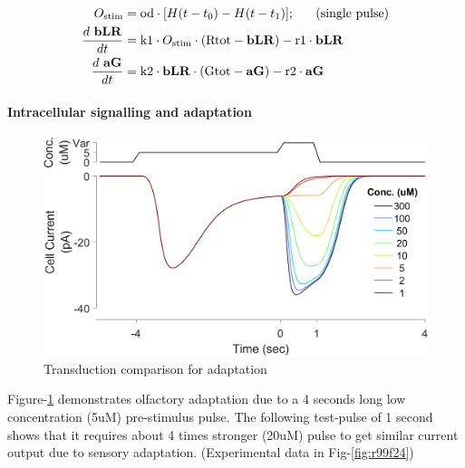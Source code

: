 \documentclass[
]{article}
\begin{document}
\begin{equation}\label{eq:tx1}
\begin{split}
O_{\rm stim} &= {\rm od} \cdot [ H(t-t_0) - H(t-t_1) ];\ \ \ \ \  \text{(single pulse)}  \\
\frac{d\ \mathbf{bLR}}{dt} &= {\rm k1} \cdot O_{\rm stim} \cdot ({\rm Rtot} - \mathbf{bLR}) - {\rm r1} \cdot \mathbf{bLR} \\
\frac{d\ \mathbf{aG}}{dt} &= {\rm k2} \cdot \mathbf{bLR} \cdot ({\rm Gtot} - \mathbf{aG}) - {\rm r2} \cdot \mathbf{aG}
\end{split}
\end{equation}

\hypertarget{intracellular-signalling-and-adaptation}{%
\paragraph*{Intracellular signalling and adaptation}\label{intracellular-signalling-and-adaptation}}

\begin{figure}

{\centering \includegraphics[width=0.7\linewidth]{figs/v1/fig_txn_compare_adaptation} 

}

\caption{Transduction comparison for adaptation}\label{fig:txAdp}
\end{figure}

Figure-\ref{fig:txAdp} demonstrates olfactory adaptation due to a 4 seconds long low concentration (5uM) pre-stimulus pulse. The following test-pulse of 1 second shows that it requires about 4 times stronger (20uM) pulse to get similar current output due to sensory adaptation. (Experimental data in Fig-\ref{fig:r99f24})
\end{document}
